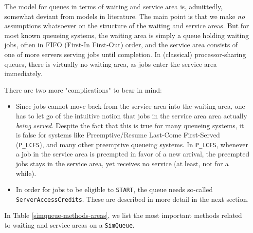 \documentclass[12pt]{book}
\begin{document}
The model for queues in terms of waiting and service area is,
  admittedly, somewhat deviant from models in literature.
The main point is that we make {\em no\/} assumptions
  whatsoever on the structure of the waiting and service areas.
But for most known queueing systems,
  the waiting area is simply a queue holding waiting jobs,
  often in FIFO (First-In First-Out) order,
  and the service area consists of one of more servers
  serving jobs until completion.
In (classical) processor-sharing queues,
  there is virtually no waiting area,
  as jobs enter the service area immediately.

There are two more "complications" to bear in mind:
\begin{itemize}
  \item Since jobs cannot move back from the service area
          into the waiting area,
          one has to let go of the intuitive notion that
          jobs in the service area area actually {\em being served}.
        Despite the fact that this is true for many queueing systems,
          it is false for systems like Preemptive/Resume Last-Come First-Served
          (\lstinline|P_LCFS|),
          and many other preemptive queueing systems.
        In \lstinline|P_LCFS|, whenever a job in the service area is preempted
          in favor of a new arrival,
          the preempted jobs stays in the service area,
          yet receives no service (at least, not for a while).
  \item In order for jobs to be eligible to \lstinline|START|,
          the queue needs so-called \lstinline|ServerAccessCredits|.
        These are described in more detail in the next section.
\end{itemize}

In Table \ref{simqueue-methods-areas},
  we list the most important methods related to waiting and service areas
  on a \lstinline|SimQueue|.
\end{document}

